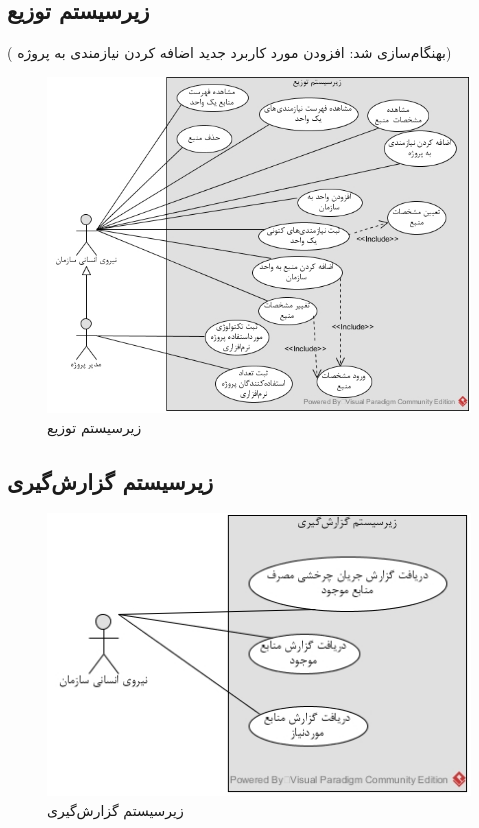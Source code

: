 \newpage
\subsection{زیرسیستم توزیع}
({\color{red} بهنگام‌سازی شد: افزودن مورد کاربرد جدید \- اضافه کردن نیازمندی به پروژه})
\begin{figure}[H]
	\centering
	\includegraphics[scale=0.8]{img/usecase/tozi}
	\caption{زیرسیستم توزیع}
\end{figure}

\subsection{زیرسیستم گزارش‌گیری}
\begin{figure}[H]
	\centering
	\includegraphics[scale=1]{img/usecase/report}
	\caption{زیرسیستم گزارش‌گیری}
\end{figure}

